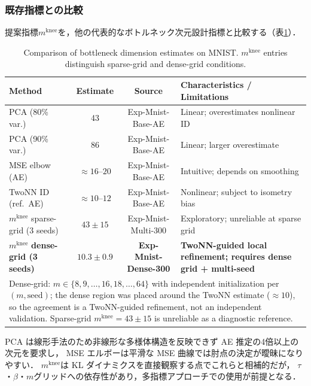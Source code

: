 \documentclass[11pt,a4paper]{jsarticle}
\newcommand{\mknee}{m^{\mathrm{knee}}}
\begin{document}
\subsubsection{既存指標との比較}\label{sec:exp_comparison}

提案指標$\mknee$を，他の代表的なボトルネック次元設計指標と比較する（表\ref{tab:method_comparison}）．

\begin{table}[H]
\centering
\caption{Comparison of bottleneck dimension estimates on MNIST. $\mknee$ entries distinguish sparse-grid and dense-grid conditions.}
\label{tab:method_comparison}
\small
\begin{tabular}{p{4.0cm}cc p{4.5cm}}
\toprule
Method & Estimate & Source & Characteristics / Limitations \\
\midrule
PCA (80\% var.) & 43 & Exp-Mnist-Base-AE & Linear; overestimates nonlinear ID \\
PCA (90\% var.) & 86 & Exp-Mnist-Base-AE & Linear; larger overestimate \\
MSE elbow (AE) & $\approx16$--$20$ & Exp-Mnist-Base-AE & Intuitive; depends on smoothing \\
TwoNN ID (ref.\ AE) & $\approx10$--$12$ & Exp-Mnist-Base-AE & Nonlinear; subject to isometry bias \\
\midrule
$\mknee$ sparse-grid (3 seeds) & $43\pm15$ & Exp-Mnist-Multi-300 & Exploratory; unreliable at sparse grid \\
$\mknee$ \textbf{dense-grid (3 seeds)} & $\boldsymbol{10.3\pm0.9}$ & \textbf{Exp-Mnist-Dense-300} & \textbf{TwoNN-guided local refinement; requires dense grid + multi-seed} \\
\midrule
\multicolumn{4}{p{13.5cm}}{\footnotesize Dense-grid: $m\in\{8,9,\ldots,16,18,\ldots,64\}$ with independent initialization per $(m,\mathrm{seed})$; the dense region was placed around the TwoNN estimate ($\approx10$), so the agreement is a TwoNN-guided refinement, not an independent validation. Sparse-grid $\mknee=43\pm15$ is unreliable as a diagnostic reference.} \\
\bottomrule
\end{tabular}
\end{table}

PCA は線形手法のため非線形な多様体構造を反映できず AE 推定の4倍以上の次元を要求し，
MSE エルボーは平滑な MSE 曲線では肘点の決定が曖昧になりやすい．
$\mknee$は KL ダイナミクスを直接観察する点でこれらと相補的だが，
$\tau$・$\beta$・$m$グリッドへの依存性があり，多指標アプローチでの使用が前提となる．
\end{document}
